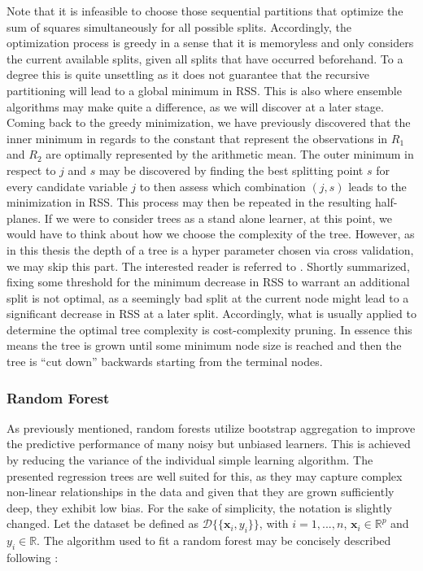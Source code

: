 \documentclass[a4paper,12pt, headsepline]{scrartcl}
\numberwithin{equation}{section}
\begin{document}
Note that it is infeasible to choose those sequential partitions that optimize the sum of squares simultaneously for all possible splits. Accordingly, the optimization process is greedy in a sense that it is memoryless and only considers the current available splits, given all splits that have occurred beforehand. To a degree this is quite unsettling as it does not guarantee that the recursive partitioning will lead to a global minimum in RSS. This is also where ensemble algorithms may make quite a difference, as we will discover at a later stage. Coming back to the greedy minimization, we have previously discovered that the inner minimum in regards to the constant that represent the observations in $R_1$ and $R_2$ are optimally represented by the arithmetic mean. The outer minimum in respect to $j$ and $s$ may be discovered by  finding the best splitting point $s$ for every candidate variable $j$ to then assess which combination $(j, s)$ leads to the minimization in RSS. This process may then be repeated in the resulting half-planes. If we were to consider trees as a stand alone learner, at this point, we would have to think about how we choose the complexity of the tree. However, as in this thesis the depth of a tree is a hyper parameter chosen via cross validation, we may skip this part. The interested reader is referred to \citet{hastie09}. Shortly summarized, fixing some threshold for the minimum decrease in RSS to warrant an additional split is not optimal, as a seemingly bad split at the current node  might lead to a significant decrease in RSS at a later split. Accordingly, what is usually applied to determine the optimal tree complexity is cost-complexity pruning. In essence this means the tree is grown until some minimum node size is reached and then the tree is \enquote{cut down} backwards starting from the terminal nodes.

\subsubsection{Random Forest}\label{subsubsec:rf}
As previously mentioned, random forests utilize bootstrap aggregation to improve the predictive performance of many noisy but unbiased learners. This is achieved by reducing the variance of the individual simple learning algorithm. The presented regression trees are well suited for this, as they may capture complex non-linear relationships in the data and given that they are grown sufficiently deep, they exhibit low bias. For the sake of simplicity, the notation is slightly changed. Let the dataset be defined as $\mathcal{D}\{\{\bm x_i, y_i\}\}$, with $i = 1, ..., n$, $\bm x_i \in \mathbb{R}^p$ and $y_i \in \mathbb{R}$. The algorithm used to fit a random forest may be concisely described following \citet{hastie09}:
\end{document}
